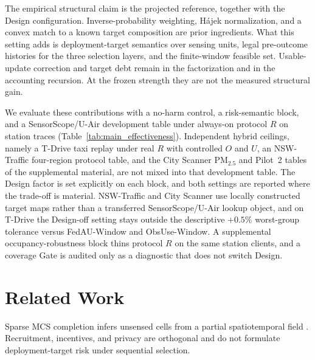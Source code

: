\documentclass[letterpaper,journal]{IEEEtran}
\begin{document}
The empirical structural claim is the projected reference, together with the
Design configuration.  Inverse-probability weighting, H\'ajek normalization, and
a convex match to a known target composition are prior ingredients.  What this
setting adds is deployment-target semantics over sensing units, legal
pre-outcome histories for the three selection layers, and the finite-window
feasible set.  Usable-update correction and target debt remain in the
factorization and in the accounting recursion.  At the frozen strength they are
not the measured structural gain.

We evaluate these contributions with a no-harm control, a risk-semantic block,
and a SensorScope/U-Air development table under always-on protocol $R$ on station
traces (Table~\ref{tab:main_effectiveness}).  Independent hybrid ceilings, namely
a T-Drive taxi replay under real $R$ with controlled $O$ and $U$, an NSW-Traffic
four-region protocol table, and the City Scanner {PM}$_{2.5}$ and Pilot~2 tables
of the supplemental material, are not mixed into that development table.  The
Design factor is set explicitly on each block, and both settings are reported
where the trade-off is material.  NSW-Traffic and City Scanner use locally
constructed target maps rather than a transferred SensorScope/U-Air lookup
object, and on T-Drive the Design-off setting stays outside the descriptive
$+0.5\%$ worst-group tolerance versus FedAU-Window and ObsUse-Window.  A
supplemental occupancy-robustness block thins protocol $R$ on the same station
clients, and a coverage Gate is audited only as a diagnostic that does not switch
Design.


\section{Related Work}
\label{sec:related_work}

Sparse MCS completion infers unsensed cells from a partial spatiotemporal
field
\cite{ganti2011mobile,guo2015mobile,ma2014opportunities,wang2023spatiotemporal,wang2023outlier,wang2023transformer,wang2024fewshot,li2024robust,wang2025evolutionary,xu2025rethinking,liu2026pyramid,zhang2026mapt,liu2026pricing}.
Recruitment, incentives, and privacy
\cite{liu2026multidimensional,zhang2025incentive,lu2025piece,zhang2026locally}
are orthogonal and do not formulate deployment-target risk under sequential
selection.
\end{document}
